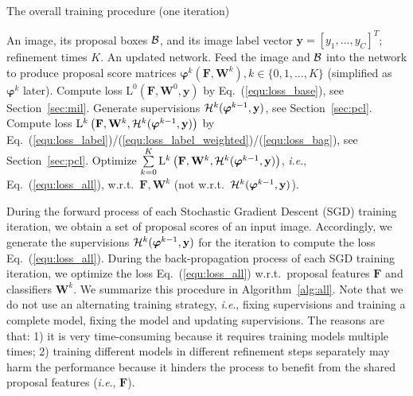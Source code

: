 \documentclass[10pt,journal,compsoc]{IEEEtran}
\def\ie{\emph{i.e}.} \def\Ie{\emph{I.e}.}
\def\wrt{w.r.t.} \def\dof{d.o.f.}
\begin{document}
\begin{algorithm}[t]{
\caption{{The overall training procedure (one iteration)}}
\label{alg:all}
\begin{algorithmic}[1]
   \REQUIRE An image, its proposal boxes ${\cal B}$, and its image label vector $\mathbf{y} = [y_{1}, ..., y_{C}]^{T}$; refinement times $K$.
   \ENSURE An updated network.
   \STATE Feed the image and ${\cal B}$ into the network to produce proposal score matrices  $\bm{\varphi}^{k}(\mathbf{F}, \mathbf{W}^{k}), k \in \{0, 1, ..., K\}$ (simplified as $\bm{\varphi}^{k}$ later).
   \STATE Compute loss $\mathrm{L}^{0}\left(\mathbf{F}, \mathbf{W}^{0}, \mathbf{y}\right)$ by Eq.~(\ref{equ:loss_base}), see Section~\ref{sec:mil}.
      \STATE Generate supervisions ${\cal H}^{k}(\bm{\varphi}^{k-1}, \mathbf{y})$, see Section~\ref{sec:pcl}.
      \STATE Compute loss $\mathrm{L}^{k}\left(\mathbf{F}, \mathbf{W}^{k}, {\cal H}^{k}(\bm{\varphi}^{k-1}, \mathbf{y})\right)$ by Eq.~(\ref{equ:loss_label})/(\ref{equ:loss_label_weighted})/(\ref{equ:loss_bag}), see Section~\ref{sec:pcl}.
   \ENDFOR
   \STATE Optimize $\mathop{\sum} \limits_{k=0}^{K} \mathrm{L}^{k}\left(\mathbf{F}, \mathbf{W}^{k}, {\cal H}^{k}(\bm{\varphi}^{k-1}, \mathbf{y})\right)$, \ie, Eq.~(\ref{equ:loss_all}), \wrt\ $\mathbf{F}, \mathbf{W}^{k}$ (not \wrt\ ${\cal H}^{k}(\bm{\varphi}^{k-1}, \mathbf{y})$).
\end{algorithmic}
}
\end{algorithm}

{During the forward process of each Stochastic Gradient Descent (SGD) training iteration,
we obtain a set of proposal scores of an input image.
Accordingly, we generate the supervisions ${\cal H}^{k}(\bm{\varphi}^{k-1}, \mathbf{y})$ for the iteration to compute the loss Eq.~(\ref{equ:loss_all}).
During the back-propagation process of each SGD training iteration,
we optimize the loss Eq.~(\ref{equ:loss_all}) \wrt\ proposal features $\mathbf{F}$ and classifiers $\mathbf{W}^{k}$.
We summarize this procedure in Algorithm~\ref{alg:all}.}
Note that we do not use an alternating training strategy,
\ie, fixing supervisions and training a complete model,
fixing the model and updating supervisions.
The reasons are that:
1) it is very time-consuming because it requires training models multiple times;
2) training different models in different refinement steps separately may harm the performance because it hinders the process to benefit from the shared proposal features (\ie, $\mathbf{F}$).
\end{document}
